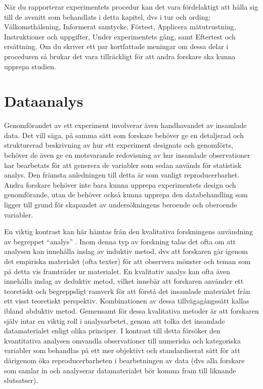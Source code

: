 \documentclass[
]{book}
\begin{document}
När du rapporterar experimentets procedur kan det vara fördelaktigt att hålla sig till de avsnitt som behandlats i detta kapitel, dvs i tur och ording: Välkomsthälsning, Informerat samtycke, Förtest, Applicera mätutrustning, Instruktioner och uppgifter, Under experimentets gång, samt Eftertest och ersättning. Om du skriver ett par kortfattade meningar om dessa delar i proceduren så brukar det vara tillräckligt för att andra forskare ska kunna upprepa studien.

\hypertarget{sec07.7}{%
\section{Dataanalys}\label{sec07.7}}

Genomförandet av ett experiment involverar även handhavandet av insamlade data. Det vill säga, på samma sätt som forskare behöver ge en detaljerad och strukturerad beskrivning av hur ett experiment designats och genomförts, behöver de även ge en motsvarande redovisning av hur insamlade observationer har bearbetats för att generera de variabler som sedan används för statistisk analys. Den främsta anledningen till detta är som vanligt reproducerbarhet. Andra forskare behöver inte bara kunna upprepa experimentets design och genomförande, utan de behöver också kunna upprepa den databehandling som ligger till grund för skapandet av undersökningens beroende och oberoende variabler.

En viktig kontrast kan här hämtas från den kvalitativa forskningens användning av begreppet ``analys'' \citep{wertz2011five}. Inom denna typ av forskning talas det ofta om att analysen kan innehålla inslag av induktiv metod, dvs att forskaren går igenom det empiriska materialet (ofta texter) för att observera mönster och teman som på detta vis framträder ur materialet. En kvalitativ analys kan ofta även innehålla inslag av deduktiv metod, vilket innebär att forskaren använder ett teoretiskt och begreppsligt ramverk för att förstå det insamlade materialet från ett visst teoretiskt perspektiv. Kombinationen av dessa tillvägagångssätt kallas ibland abduktiv metod. Gemensamt för dessa kvalitativa metoder är att forskaren själv intar en viktig roll i analysarbetet, genom att tolka det insamlade datamaterialet enligt olika principer. I kontrast till detta försöker den kvantitativa analysen omvandla observationer till numeriska och kategoriska variabler som behandlas på ett mer objektivt och standardiserat sätt för att därigenom öka reproducerbarheten i bearbetningen av data (dvs alla forskare som samlar in och analyserar datamaterialet bör komma fram till liknande slutsatser).
\end{document}
